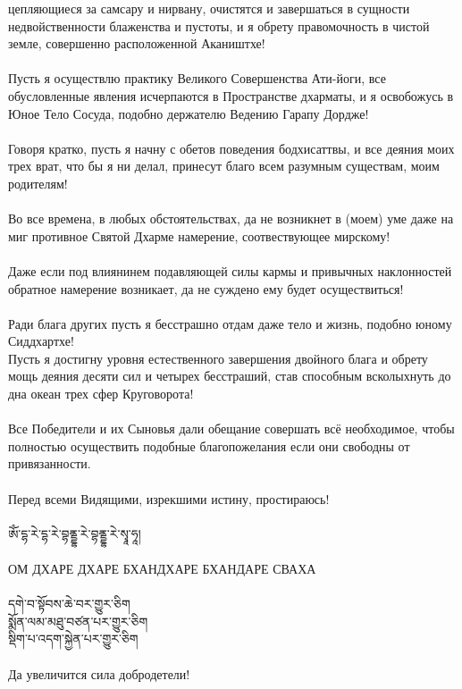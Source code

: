цепляю\-щиеся за самсару и нирвану, очистятся и завершаться
в сущности недвойственности блаженства и пустоты,
и я обрету правомочность в чистой земле, совершенно расположенной Акаништхе!\\
\\
Пусть я осуществлю практику Великого Совершенства Ати-йоги,
все обусловленные явления исчерпаются в Пространстве дхарматы,
и я освобожусь в Юное Тело Сосуда, подобно держателю Ведению Гарапу Дордже!\\
\\
Говоря кратко, пусть я начну с обетов поведения бодхисаттвы,
и все деяния моих трех врат, что бы я ни делал,
принесут благо всем разумным существам, моим родителям!\\
\\
Во все времена, в любых обстоятельствах, да не возникнет
в (моем) уме даже на миг противное Святой Дхарме намерение, соотвествующее мирскому!\\
\\
Даже если под влиянинем подавляющей силы кармы и привыч\-ных наклонностей 
обратное намерение возникает, да не сужде\-но ему будет осуществиться!\\
\\
Ради блага других пусть я бесстрашно отдам даже тело и жизнь, подобно юному Сиддхартхе!\\
\newpage
Пусть я достигну уровня естественного завершения двойного блага 
и обрету мощь деяния десяти сил и четырех бесстраший,
став способным всколыхнуть до дна океан трех сфер Кругово\-рота!\\
\\
Все Победители и их Сыновья дали обещание совершать всё необходимое,
чтобы полностью осуществить подобные благопожелания
если они свободны от привязанности.\\
\\
Перед всеми Видящими, изрекшими истину, простираюсь!
\\
\\
\ti
ཨོཾ་དྷ་རེ་དྷ་རེ་བྷནྡྷ་རེ་བྷནྡྷ་རེ་སྭཱ་ཧཱ། \\
\\
\ru 
ОМ ДХАРЕ ДХАРЕ БХАНДХАРЕ БХАНДАРЕ СВАХА\\
\\
\ti
དགེ་བ་སྟོབས་ཆེ་བར་གྱུར་ཅིག \\
སྨོན་ལམ་མཐུ་བཙན་པར་གྱུར་ཅིག \\
སྡིག་པ་འདག་སྐྱེན་པར་གྱུར་ཅིག \\
\\
\ru \noindent
Да увеличится сила добродетели!\\
